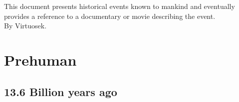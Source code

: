\documentclass[11pt]{report}
\begin{document}
\begin{center}
\vspace*{\fill}
This document presents historical events known to mankind and eventually provides a reference to a documentary or movie describing the event.\\
By Virtuosek.\\ \vspace{5cm}
\end{center}

\vspace*{\fill}
\pagebreak

\tableofcontents
\pagebreak
\setcounter{secnumdepth}{5}

										
		

\part{Prehuman}
\chapter{13.6 Billion years ago}
\end{document}
